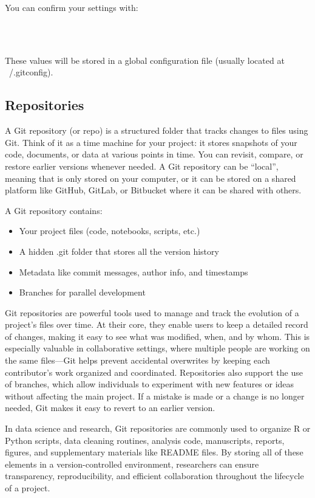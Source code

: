 You can confirm your settings with:
\begin{terminal}
\\
\\
\end{terminal}
These values will be stored in a global configuration file (usually located at ~/.gitconfig).


\subsection*{Repositories}
A Git repository (or repo) is a structured folder that tracks changes to files using Git. Think of it as a time machine for your project: it stores snapshots of your code, documents, or data at various points in time. You can revisit, compare, or restore earlier versions whenever needed. A Git repository can be ``local'', meaning that is only stored on your computer, or it can be stored on a shared platform like GitHub, GitLab, or Bitbucket where it can be shared with others.

\noindent A Git repository contains:
\begin{itemize}
\item Your project files (code, notebooks, scripts, etc.)
\item A hidden .git folder that stores all the version history
\item Metadata like commit messages, author info, and timestamps
\item Branches for parallel development
\end{itemize}

Git repositories are powerful tools used to manage and track the evolution of a project’s files over time. At their core, they enable users to keep a detailed record of changes, making it easy to see what was modified, when, and by whom. This is especially valuable in collaborative settings, where multiple people are working on the same files—Git helps prevent accidental overwrites by keeping each contributor’s work organized and coordinated. Repositories also support the use of branches, which allow individuals to experiment with new features or ideas without affecting the main project. If a mistake is made or a change is no longer needed, Git makes it easy to revert to an earlier version.

In data science and research, Git repositories are commonly used to organize R or Python scripts, data cleaning routines, analysis code, manuscripts, reports, figures, and supplementary materials like README files. By storing all of these elements in a version-controlled environment, researchers can ensure transparency, reproducibility, and efficient collaboration throughout the lifecycle of a project.

